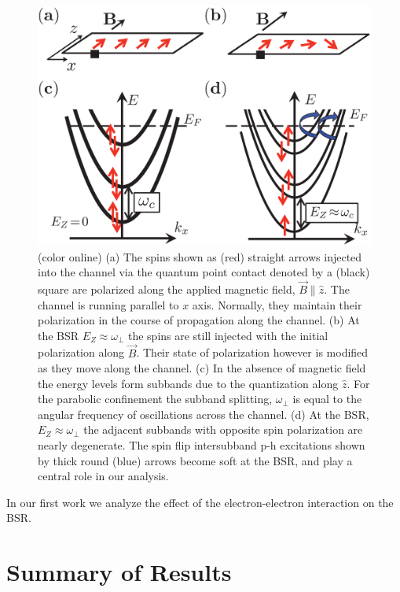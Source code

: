 \begin{figure}[h]
\begin{center}
\includegraphics[width=0.5\columnwidth]{fig1.eps}
\caption{ (color online) 
(a) The spins shown as (red) straight arrows injected into the channel via the quantum point contact denoted by a (black) square are polarized along the applied magnetic field, $\vec{B} \parallel \hat{z}$. 
The channel is running parallel to $x$ axis. 
Normally, they maintain their polarization in the course of propagation along the channel.
(b) At the BSR $E_Z \approx \omega_{\perp}$ the spins are still injected with the initial polarization along $\vec{B}$.
Their state of polarization however is modified as they move along the channel.
(c) In the absence of magnetic field the energy levels form subbands due to the quantization along $\hat{z}$.
For the parabolic confinement the subband splitting, $\omega_{\perp}$ is equal to the angular frequency of oscillations across the channel.
(d) At the BSR, $E_Z \approx \omega_{\perp}$ the adjacent subbands with opposite spin polarization are nearly degenerate.
The spin flip intersubband p-h excitations shown by thick round (blue) arrows become soft at the BSR, and play a central role in our analysis.\cite{Iqbal}}
\label{fig:setup}
\end{center}
\end{figure}


In our first work we analyze the effect of the electron-electron interaction on the BSR.


\section{Summary of Results}

